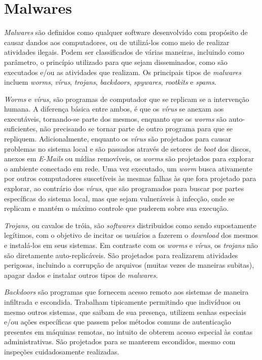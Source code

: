 \section{Malwares}


\textit{Malwares} são definidos como qualquer software desenvolvido com propósito de causar dandos aos computadores, ou de utilizá-los como meio de realizar atividades ilegais. Podem ser classificados de várias maneiras, incluindo como parâmetro, o princípio utilizado para que sejam disseminados, como são executados e/ou as atividades que realizam. Os principais tipos de \textit{malwares} incluem \textit{worms}, \textit{vírus}, \textit{trojans}, \textit{backdoors}, \textit{spywares}, \textit{rootkits} e \textit{spams}.

\textit{Worms} e \textit{vírus}, são programas de computador que se replicam se a intervenção humana. A diferença básica entre ambos, é que os \textit{vírus} se anexam aos executáveis, tornando-se parte dos mesmos, enquanto que os \textit{worms} são auto-suficientes, não precisando se tornar parte de outro programa para que se repliquem. Adicionalmente, enquanto os \textit{vírus} são projetados para causar problemas no sistema local e são passados através de setores de \textit{boot} dos discos, anexos em \textit{E-Mails} ou mídias removíveis, os \textit{worms} são projetados para explorar o ambiente conectado em rede. Uma vez executado, um \textit{worm} busca ativamente por outros computadores suscetíveis às mesmas falhas às que fora projetado para explorar, ao contrário dos \textit{vírus}, que são programados para buscar por partes específicas do sistema local, mas que sejam vulneráveis à infecção, onde se replicam e mantém o máximo controle que puderem sobre sua execução.

\textit{Trojans}, ou cavalos de tróia, são \textit{softwares} distribuidos como sendo supostamente legítimos, com o objetivo de incitar os usuários a fazerem o \textit{download} dos mesmos e instalá-los em seus sistemas. Em contraste com os \textit{worms} e \textit{vírus}, os \textit{trojans} não são diretamente auto-replicáveis. São projetados para realizarem atividades perigosas, incluindo a corrupção de arquivos (muitas vezes de maneiras subitas), apagar dados e instalar outros tipos de \textit{malwares}.

\textit{Backdoors} são programas que fornecem acesso remoto aos sistemas de maneira infiltrada e escondida. Trabalham tipicamente permitindo que indivíduos ou mesmo outros sistemas, que saibam de sua presença, utilizem senhas especiais e/ou ações específicas que passem pelos métodos comuns de autenticação presentes em máquinas remotas, no intuito de obterem acesso especial às contas administrativas. São projetados para se manterem escondidos, mesmo com inspeções cuidadosamente realizadas.

